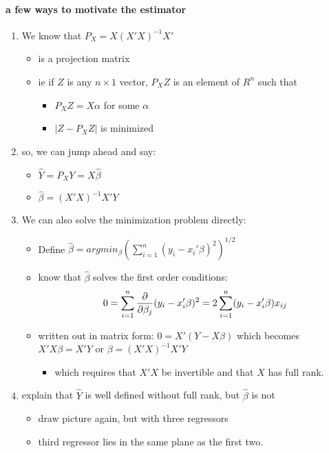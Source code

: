 \paragraph{a few ways to motivate the estimator}
\begin{enumerate}
\item We know that $P_X = X(X'X)^{-1}X'$
\begin{itemize}
\item is a projection matrix
\item ie if $Z$ is any $n\times1$ vector, $P_X Z$ is an element of
            $R^n$ such that
\begin{itemize}
\item $P_X Z = X \alpha$ for some $\alpha$
\item $| Z - P_X Z |$ is minimized
\end{itemize}
\end{itemize}
\item so, we can jump ahead and say:
\begin{itemize}
\item $\hat Y = P_X Y = X \hat\beta$
\item $\hat \beta = (X'X)^{-1} X'Y$
\end{itemize}
\item We can also solve the minimization problem directly:
\begin{itemize}
\item Define $\hat \beta = argmin_\beta \left(\sum_{i=1}^n (y_i -
            x_i'\beta)^2 \right)^{1/2}$
\item know that $\hat \beta$ solves the first order conditions:
            \[ 0 = \sum_{i=1}^n {\partial \over \partial \beta_j} (y_i -
            x_i'\beta)^2 = 2 \sum_{i=1}^n (y_i - x_i'\beta) x_{ij} \]
\item written out in matrix form: $0 = X'(Y - X\beta)$ which
            becomes $X'X\beta = X'Y$ or $\beta = (X'X)^{-1}X'Y$
\begin{itemize}
\item which requires that $X'X$ be invertible and that $X$ has
              full rank.
\end{itemize}
\end{itemize}
\item explain that $\hat Y$ is well defined without full rank, but
          $\hat \beta$ is not
\begin{itemize}
\item draw picture again, but with three regressors
\item third regressor lies in the same plane as the first two.

\end{itemize}
\end{enumerate}
